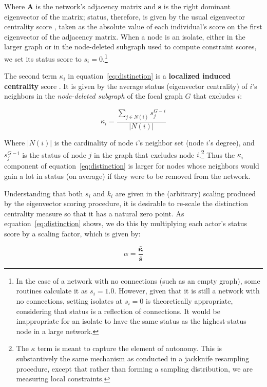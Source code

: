 \documentclass[12pt]{article}
\begin{document}
Where $\mathbf{A}$ is the network's adjacency matrix and $\mathbf{s}$ is the right dominant eigenvector of the matrix; status, therefore, is given by the usual eigenvector centrality score \citep{bonacich1972factoring-03e}, taken as the absolute value of each individual's score on the first eigenvector of the adjacency matrix. When a node is an isolate, either in the larger graph or in the node-deleted subgraph used to compute constraint scores, we set its status score to $s_i =0$.\footnote{In the case of a network with no connections (such as an empty graph), some routines calculate it as $s_i =1.0$. However, given that it is still a network with no connections, setting isolates at $s_i =0$ is theoretically appropriate, considering that status is a reflection of connections. It would be inappropriate for an isolate to have the same status as the highest-status node in a large network.}

The second term $\kappa_i$ in equation~\ref{eq:distinction} is a \textbf{localized induced centrality} score \citep{borgatti2020oxford-fa6}. It is given by the average status (eigenvector centrality) of $i$'s neighbors in the \textit{node-deleted subgraph} of the focal graph $G$ that excludes $i$:

\begin{equation}
    \kappa_i = \frac{\sum_{j \in N(i)}s_j^{G-i}}{|N(i)|}
\end{equation}

Where $|N(i)|$ is the cardinality of node $i$'s neighbor set (node $i$'s degree), and $s_j^{G-i}$ is the status of node $j$ in the graph that excludes node $i$.\footnote{The $\kappa$ term is meant to capture the element of autonomy. This is substantively the same mechanism as conducted in a jackknife resampling procedure, except that rather than forming a sampling distribution, we are measuring local constraints.} Thus the $\kappa_i$ component of equation~\ref{eq:distinction} is larger for nodes whose neighbors would gain a lot in status (on average) if they were to be removed from the network. 

Understanding that both $s_i$ and $k_i$ are given in the (arbitrary) scaling produced by the eigenvector scoring procedure, it is desirable to re-scale the distinction centrality measure so that it has a natural zero point. As equation~\ref{eq:distinction} shows, we do this by multiplying each actor's status score by a scaling factor, which is given by:

\begin{equation}
    \alpha = \frac{\bar{\mathbf{\kappa}}}{\bar{\mathbf{s}}}
\end{equation}
\end{document}
